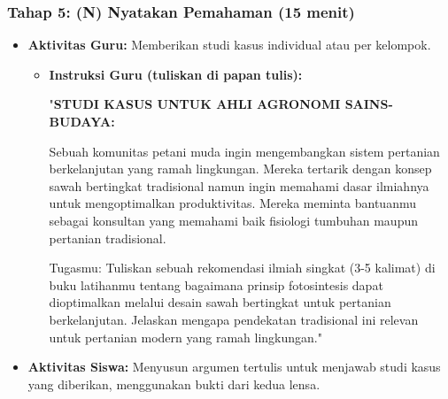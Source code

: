 \documentclass[a4paper,12pt]{article}
\begin{document}
\subsubsection{Tahap 5: (N) Nyatakan Pemahaman (15 menit)}
\begin{itemize}
\item \textbf{Aktivitas Guru:} Memberikan studi kasus individual atau per kelompok.
    \begin{itemize}
    \item \textbf{Instruksi Guru (tuliskan di papan tulis):}
    
    "\textbf{STUDI KASUS UNTUK AHLI AGRONOMI SAINS-BUDAYA:}
    
    Sebuah komunitas petani muda ingin mengembangkan sistem pertanian berkelanjutan yang ramah lingkungan. Mereka tertarik dengan konsep sawah bertingkat tradisional namun ingin memahami dasar ilmiahnya untuk mengoptimalkan produktivitas. Mereka meminta bantuanmu sebagai konsultan yang memahami baik fisiologi tumbuhan maupun pertanian tradisional.
    
    Tugasmu: Tuliskan sebuah rekomendasi ilmiah singkat (3-5 kalimat) di buku latihanmu tentang bagaimana prinsip fotosintesis dapat dioptimalkan melalui desain sawah bertingkat untuk pertanian berkelanjutan. Jelaskan mengapa pendekatan tradisional ini relevan untuk pertanian modern yang ramah lingkungan."
    \end{itemize}
\item \textbf{Aktivitas Siswa:} Menyusun argumen tertulis untuk menjawab studi kasus yang diberikan, menggunakan bukti dari kedua lensa.
\end{itemize}
\end{document}
